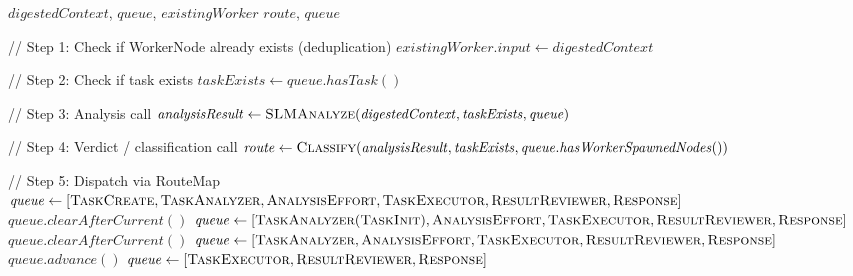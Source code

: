 \documentclass{article}
\begin{document}
\begin{algorithm}[t]
\caption{TINYCUA Worker Node}
\label{alg:worker}
\begin{algorithmic}[1]
\Require $\mathit{digestedContext}$, $\mathit{queue}$, $\mathit{existingWorker}$
\Ensure $\mathit{route}$, $\mathit{queue}$

// Step 1: Check if WorkerNode already exists (deduplication)
    \State $\mathit{existingWorker.input} \gets \mathit{digestedContext}$
    \State \Return
\EndIf

// Step 2: Check if task exists
\State $\mathit{taskExists} \gets \mathit{queue.hasTask()}$

// Step 3: Analysis call
\State $\mathit{analysisResult} \gets \textsc{SLMAnalyze}(\mathit{digestedContext}, \mathit{taskExists}, \mathit{queue})$

// Step 4: Verdict / classification call
\State $\mathit{route} \gets \textsc{Classify}(\mathit{analysisResult}, \mathit{taskExists}, \mathit{queue.hasWorkerSpawnedNodes()})$

// Step 5: Dispatch via RouteMap
    \State $\mathit{queue} \gets [\textsc{TaskCreate}, \textsc{TaskAnalyzer}, \textsc{AnalysisEffort}, \textsc{TaskExecutor}, \textsc{ResultReviewer}, \textsc{Response}]$
    \State $\mathit{queue.clearAfterCurrent()}$
    \State $\mathit{queue} \gets [\textsc{TaskAnalyzer}(\textsc{TaskInit}), \textsc{AnalysisEffort}, \textsc{TaskExecutor}, \textsc{ResultReviewer}, \textsc{Response}]$
    \State $\mathit{queue.clearAfterCurrent()}$
    \State $\mathit{queue} \gets [\textsc{TaskAnalyzer}, \textsc{AnalysisEffort}, \textsc{TaskExecutor}, \textsc{ResultReviewer}, \textsc{Response}]$
    \State $\mathit{queue.advance()}$
    \State $\mathit{queue} \gets [\textsc{TaskExecutor}, \textsc{ResultReviewer}, \textsc{Response}]$
\EndIf

\end{algorithmic}
\end{algorithm}
\end{document}
